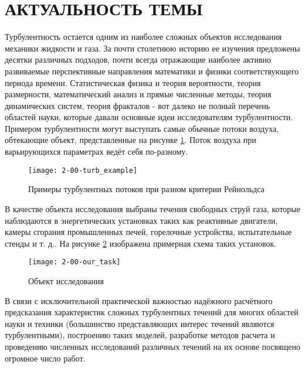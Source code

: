 \section{АКТУАЛЬНОСТЬ ТЕМЫ}

Турбулентность остается одним из наиболее сложных объектов исследования механики жидкости и газа. За почти столетнюю историю ее изучения предложены десятки различных подходов, почти всегда отражающие наиболее активно развиваемые перспективные направления математики и физики соответствующего периода времени. Статистическая физика и теория вероятности, теория размерности, математический анализ и прямые численные методы, теория динамических систем, теория фракталов - вот далеко не полный перечень областей науки, которые давали основные идеи исследователям турбулентности. Примером турбулентности могут выступать самые обычные потоки воздуха, обтекающие объект, представленные на рисунке \ref{fig:actuality}. Поток воздуха при варьирующихся параметрах ведёт себя по-разному.

\begin{figure}
    \texttt{[image: 2-00-turb\_example]}
    \caption{Примеры турбулентных потоков при разном критерии Рейнольдса}
    \label{fig:actuality}
\end{figure}

В качестве объекта исследования выбраны течения свободных струй газа, которые наблюдаются в энергетических установках таких как реактивные двигатели, камеры сгорания промышленных печей, горелочные устройства, испытательные стенды и т. д.. На рисунке \ref{fig:actuality2} изображена примерная схема таких установок.

\begin{figure}
    \texttt{[image: 2-00-our\_task]}
    \caption{Объект исследования}
    \label{fig:actuality2}
\end{figure}

В связи с исключительной практической важностью надёжного расчётного предсказания характеристик сложных турбулентных течений для многих областей науки и техники (большинство представляющих интерес течений являются турбулентными), построению таких моделей, разработке методов расчета и проведению численных исследований различных течений на их основе посвящено огромное число работ.
